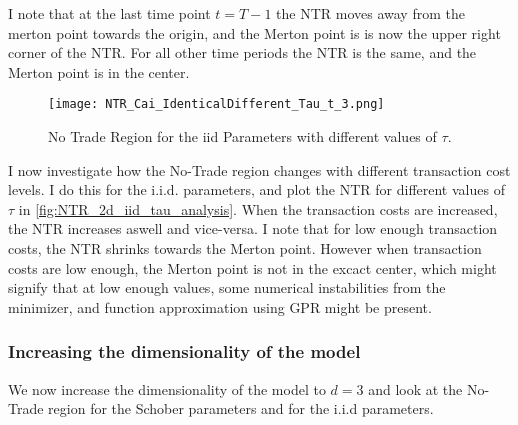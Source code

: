 \documentclass[11pt]{article}
\begin{document}
I note that at the last time point $t = T-1$ the \ac{NTR} moves away from the merton point towards the origin, and the Merton point is is
now the upper right corner of the \ac{NTR}. For all other time periods the \ac{NTR} is the same, and the Merton point is in the center.

\begin{figure}[!ht]
    \centering
    \texttt{[image: NTR\_Cai\_IdenticalDifferent\_Tau\_t\_3.png]}
    \caption{No Trade Region for the iid Parameters with different values of $\tau$.}
    \label{fig:NTR_2d_iid_tau_analysis}
\end{figure}
I now investigate how the No-Trade region changes with different transaction cost levels.
I do this for the i.i.d. parameters, and plot the \ac{NTR} for different values of $\tau$ in \autoref{fig:NTR_2d_iid_tau_analysis}.
When the transaction costs are increased, the \ac{NTR} increases aswell and vice-versa. 
I note that for low enough transaction costs, the \ac{NTR} shrinks towards the Merton point.
However when transaction costs are low enough, the Merton point is not in the excact center, which might signify that at low enough values, some numerical instabilities from the
minimizer, and function approximation using \ac{GPR} might be present.

\subsubsection{Increasing the dimensionality of the model} \label{Subsubsection: IncreasingDimensionality}
We now increase the dimensionality of the model to $d = 3$ and look at the No-Trade region for the Schober parameters and for the i.i.d parameters.
\end{document}
